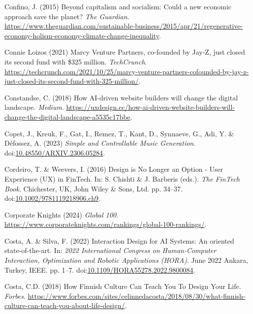 \documentclass[
  letterpaper,
  DIV=11,
  numbers=noendperiod]{scrartcl}
\newlength{\cslhangindent}
\newenvironment{CSLReferences}[2] %
 {\begin{list}{}{%
  \setlength{\itemindent}{0pt}
  \setlength{\leftmargin}{0pt}
  \setlength{\parsep}{0pt}
  \ifodd #1
   \setlength{\leftmargin}{\cslhangindent}
   \setlength{\itemindent}{-1\cslhangindent}
  \fi
  \setlength{\itemsep}{#2\baselineskip}}}
 {\end{list}}
\begin{document}
\begin{CSLReferences}{0}{1}
Confino, J. (2015) Beyond capitalism and socialism: Could a new economic
approach save the planet? \emph{The Guardian}.
\url{https://www.theguardian.com/sustainable-business/2015/apr/21/regenerative-economy-holism-economy-climate-change-inequality}.

Connie Loizos (2021) Marcy {Venture Partners}, co-founded by {Jay-Z},
just closed its second fund with \$325 million. \emph{TechCrunch}.
\url{https://techcrunch.com/2021/10/25/marcy-venture-partners-cofounded-by-jay-z-just-closed-its-second-fund-with-325-million/}.

Constandse, C. (2018) How {AI-driven} website builders will change the
digital landscape. \emph{Medium}.
\url{https://uxdesign.cc/how-ai-driven-website-builders-will-change-the-digital-landscape-a5535c17bbe}.

Copet, J., Kreuk, F., Gat, I., Remez, T., Kant, D., Synnaeve, G., Adi,
Y. \& Défossez, A. (2023) \emph{Simple and {Controllable Music
Generation}}.
doi:\href{https://doi.org/10.48550/ARXIV.2306.05284}{10.48550/ARXIV.2306.05284}.

Cordeiro, T. \& Weevers, I. (2016) Design is {No Longer} an {Option} -
{User Experience} ({UX}) in {FinTech}. In: S. Chishti \& J. Barberis
(eds.). \emph{The {FinTech Book}}. Chichester, UK, John Wiley \& Sons,
Ltd. pp. 34--37.
doi:\href{https://doi.org/10.1002/9781119218906.ch9}{10.1002/9781119218906.ch9}.

Corporate Knights (2024) \emph{Global 100}.
\url{https://www.corporateknights.com/rankings/global-100-rankings/}.

Costa, A. \& Silva, F. (2022) Interaction {Design} for {AI Systems}:
{An} oriented state-of-the-art. In: \emph{2022 {International Congress}
on {Human-Computer Interaction}, {Optimization} and {Robotic
Applications} ({HORA})}. June 2022 Ankara, Turkey, IEEE. pp. 1--7.
doi:\href{https://doi.org/10.1109/HORA55278.2022.9800084}{10.1109/HORA55278.2022.9800084}.

Costa, C.D. (2018) How {Finnish Culture Can Teach You To Design Your
Life}. \emph{Forbes}.
\url{https://www.forbes.com/sites/celinnedacosta/2018/08/30/what-finnish-culture-can-teach-you-about-life-design/}.


\end{CSLReferences}
\end{document}
